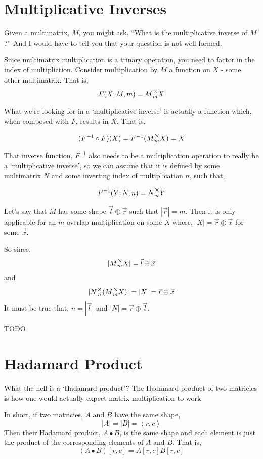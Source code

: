 \documentclass[12pt]{book}
\theoremstyle{plain}
\theoremstyle{definition}
\theoremstyle{ppart}
\theoremstyle{case}
\theoremstyle{solution}
\newcommand{\mmult}[1]{\text{\raisebox{1ex}{$\underset{#1}{\times}$}}}
\begin{document}
\section{Multiplicative Inverses}

Given a multimatrix, $M$, you might ask, ``What is the multiplicative inverse of $M$?''
And I would have to tell you that your question is not well formed.

Since multimatrix multiplication is a trinary operation, you need to factor in the
index of multipliction. Consider multiplication by $M$ a function on $X$ - some other
multimatrix. That is, 
\[ F(X; M, m) = M \mmult{m} X \]

What we're looking for in a `multiplicative inverse' is actually a function which,
when composed with $F$, results in $X$. That is,

\[ (F^{-1} \circ F)(X) = F^{-1}(M \mmult{m} X) = X \]

That inverse function, $F^{-1}$ also needs to be a multiplication operation to
really be a `multiplicative inverse', so we can assume that it is defined by
some multimatrix $N$ and some inverting index of multiplication $n$, such that,

\[ F^{-1} (Y; N, n) = N \mmult{n} Y \]

Let's say that $M$ has some shape $\vec{l} \oplus \vec{r}$ such that $|\vec{r}| = m$.
Then it is only applicable for an $m$ overlap multiplication on some $X$ where,
$|X| = \vec{r} \oplus \vec{x}$ for some $\vec{x}$.

So since,
\[ |M \mmult{m} X| = \vec{l} \oplus \vec{x}\]
and
\[ |N \mmult{n} (M \mmult{m} X)| = |X| = \vec{r} \oplus \vec{x} \]
It must be true that, $n = |\vec{l}|$ and $|N| = \vec{r} \oplus \vec{l}$.

TODO

\section{Hadamard Product}

What the hell is a `Hadamard product'? The Hadamard product \cite{wiki:hadamard}
of two matricies is how one would actually expect matrix multiplication to work.

In short, if two matricies, $A$ and $B$ have the same shape,
\[ |A| = |B| = \left<r,c\right> \]
Then their Hadamard product, $A \bullet B$, is the same shape and each element
is just the product of the corresponding elements of $A$ and $B$. That is,
\[ (A \bullet B)[r,c] = A[r,c] B[r,c] \]
\end{document}
